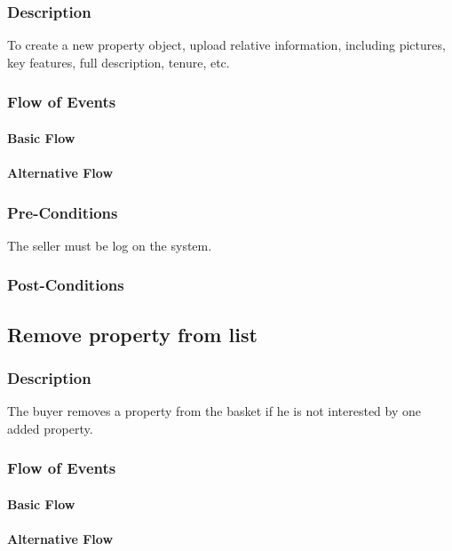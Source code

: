 \documentclass[a4paper,12pt]{article}
\begin{document}
\subsubsection{Description}
To create a new property object, upload relative information, including pictures, key features, full description, tenure, etc.
\subsubsection{Flow of Events}
\paragraph{Basic Flow}
\begin{itemize}
\end{itemize}
\paragraph{Alternative Flow}
\begin{itemize}
\end{itemize}
\subsubsection{Pre-Conditions}
The seller must be log on the system.
\subsubsection{Post-Conditions}

\subsection{Remove property from list}
\subsubsection{Description}
The buyer removes a property from the basket if he is not interested by one added property.
\subsubsection{Flow of Events}
\paragraph{Basic Flow}
\begin{itemize}
\end{itemize}
\paragraph{Alternative Flow}
\begin{itemize}
\end{itemize}
\end{document}
